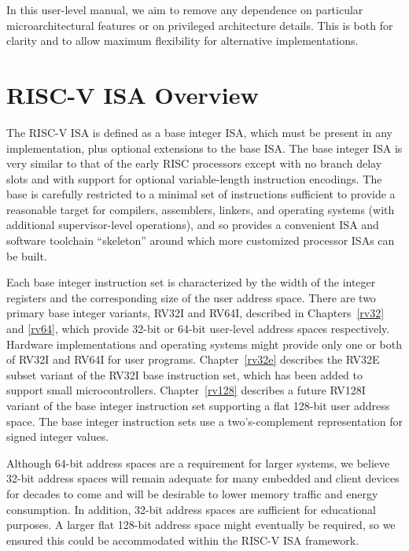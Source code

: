 \begin{commentary}
In this user-level manual, we aim to remove any dependence on
particular microarchitectural features or on privileged architecture
details.  This is both for clarity and to allow maximum flexibility
for alternative implementations.
\end{commentary}

\section{RISC-V ISA Overview}

The RISC-V ISA is defined as a base integer ISA, which must be present
in any implementation, plus optional extensions to the base ISA.  The
base integer ISA is very similar to that of the early RISC processors
except with no branch delay slots and with support for optional
variable-length instruction encodings.  The base is carefully
restricted to a minimal set of instructions sufficient to provide a
reasonable target for compilers, assemblers, linkers, and operating
systems (with additional supervisor-level operations), and so provides
a convenient ISA and software toolchain ``skeleton'' around which more
customized processor ISAs can be built.

Each base integer instruction set is characterized by the width of the
integer registers and the corresponding size of the user address
space.  There are two primary base integer variants, RV32I and RV64I,
described in Chapters~\ref{rv32} and \ref{rv64}, which provide 32-bit
or 64-bit user-level address spaces respectively.  Hardware
implementations and operating systems might provide only one or both
of RV32I and RV64I for user programs.  Chapter~\ref{rv32e} describes
the RV32E subset variant of the RV32I base instruction set, which has
been added to support small microcontrollers.  Chapter~\ref{rv128}
describes a future RV128I variant of the base integer instruction set
supporting a flat 128-bit user address space.  The base integer
instruction sets use a two's-complement representation for signed
integer values.

\begin{commentary}
Although 64-bit address spaces are a requirement for larger systems,
we believe 32-bit address spaces will remain adequate for many
embedded and client devices for decades to come and will be desirable
to lower memory traffic and energy consumption.  In addition, 32-bit
address spaces are sufficient for educational purposes.  A larger flat
128-bit address space might eventually be required, so we ensured this
could be accommodated within the RISC-V ISA framework.
\end{commentary}

